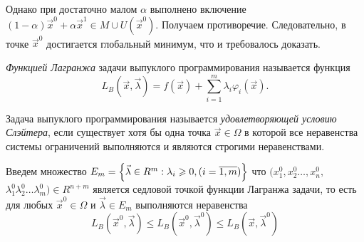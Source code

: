 Однако при достаточно малом $\alpha$ выполнено включение $(1 - \alpha)\vec x^0 + \alpha \vec x^1 \in M \cup U(\vec x^0)$. Получаем противоречие.
Следовательно, в точке $\vec x^0$ достигается глобальный минимум, что и требовалось доказать.

\textit{Функцией Лагранжа} задачи выпуклого программирования называется функция
\[
  L_B(\vec x, \vec \lambda) = f(\vec x) + \sum\limits_{i=1}^m \lambda_i\varphi_i(\vec x).
\]

Задача выпуклого программирования называется \textit{удовлетворяющей условию Слэйтера}, если существует хотя бы одна точка $\vec x \in \Omega$
в которой все неравенства системы ограничений выполняются и являются строгими неравенствами.

Введем множество $E_m =\Bigl\{\vec\lambda \in R^m : \lambda_i \geqslant 0, (i = \overline{1,m})\Bigl\}$
 что $(x_1^0,x_2^0\dots,x_n^0,$ $\lambda_1^0\lambda_2^0\dots\lambda_m^0) \in R^{n+m}$ является седловой точкой функции Лагранжа задачи, то есть для любых $\vec x^0 \in \Omega$ и $\vec \lambda \in E_m$ выполняются неравенства
\[
   L_B(\vec x^{0}, \vec \lambda) \leqslant L_B(\vec x^0, \vec \lambda^0)  \leqslant  L_B(\vec x, \vec \lambda^0)
\]

